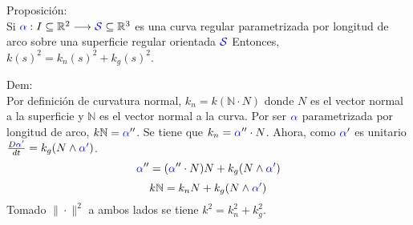 \documentclass{article}
\newcommand{\bb}[1]{\mathbb{#1}}
\begin{document}
\textcolor{WildStrawberry}{Proposición:}\\
Si $\textcolor{blue}{\alpha}: I\subseteq \bb{R}^2 \longrightarrow \textcolor{blue}{\mathcal{S}}\subseteq \bb{R}^3$ es una curva regular parametrizada por longitud de arco sobre una superficie regular orientada $\textcolor{blue}{\mathcal{S}}$ Entonces, $k(s)^2=k_n(s)^2+k_g(s)^2$.

\textcolor{WildStrawberry}{Dem:}\\
Por definición de curvatura normal, $k_n = k (\bb{N}\cdot N)$ donde $N$ es el vector normal a la superficie y $\bb{N}$ es el vector normal a la curva. Por ser $\textcolor{blue}{\alpha}$ parametrizada por longitud de arco, $k\bb{N}=\textcolor{blue}{\alpha}''$. Se tiene que $k_n = \textcolor{blue}{\alpha}''\cdot N$. Ahora, como $\textcolor{blue}{\alpha}'$ es unitario $\frac{D \textcolor{blue}{\alpha'}}{dt} = k_g (N\land \textcolor{blue}{\alpha'})$.
$$
\textcolor{blue}{\alpha}'' = (\textcolor{blue}{\alpha}''\cdot N)N + k_g (N\land \textcolor{blue}{\alpha'})
$$
$$
k \bb{N} = k_n N + k_g (N\land \textcolor{blue}{\alpha'})
$$
Tomado $\| \cdot \|^2$ a ambos lados se tiene $k^2 = k_n^2 + k_g^2$.
\end{document}
